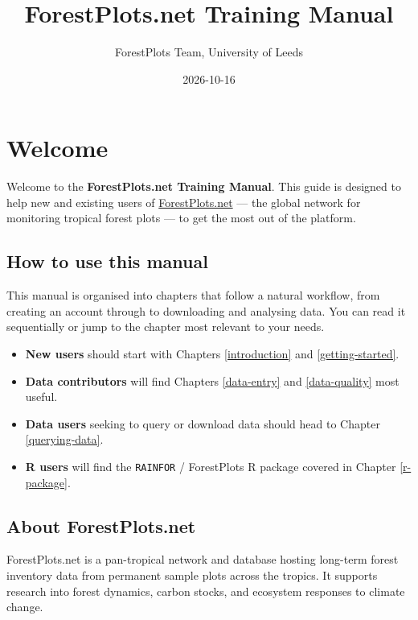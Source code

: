 \documentclass[
]{book}
\title{ForestPlots.net Training Manual}
\author{ForestPlots Team, University of Leeds}
\date{2026-10-16}
\providecommand{\tightlist}{%
  \setlength{\itemsep}{0pt}\setlength{\parskip}{0pt}}
\begin{document}
\maketitle

{
\setcounter{tocdepth}{1}
\tableofcontents
}
\chapter*{Welcome}\label{welcome}

Welcome to the \textbf{ForestPlots.net Training Manual}. This guide is designed to help new and existing users of \href{https://forestplots.net}{ForestPlots.net} --- the global network for monitoring tropical forest plots --- to get the most out of the platform.

\section*{How to use this manual}\label{how-to-use-this-manual}

This manual is organised into chapters that follow a natural workflow, from creating an account through to downloading and analysing data. You can read it sequentially or jump to the chapter most relevant to your needs.

\begin{itemize}
\tightlist
\item
  \textbf{New users} should start with Chapters \ref{introduction} and \ref{getting-started}.
\item
  \textbf{Data contributors} will find Chapters \ref{data-entry} and \ref{data-quality} most useful.
\item
  \textbf{Data users} seeking to query or download data should head to Chapter \ref{querying-data}.
\item
  \textbf{R users} will find the \texttt{RAINFOR} / ForestPlots R package covered in Chapter \ref{r-package}.
\end{itemize}

\section*{About ForestPlots.net}\label{about-forestplots.net}

ForestPlots.net is a pan-tropical network and database hosting long-term forest inventory data from permanent sample plots across the tropics. It supports research into forest dynamics, carbon stocks, and ecosystem responses to climate change.
\end{document}
